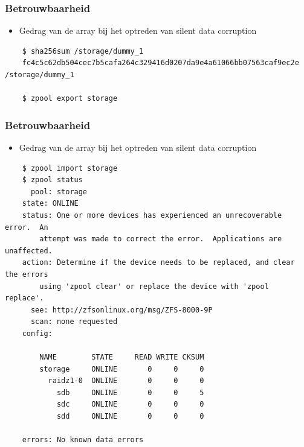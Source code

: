 \documentclass{beamer}
\begin{document}
\begin{frame}[fragile]
  \frametitle{Betrouwbaarheid}
  \begin{itemize}
    \item Gedrag van de array bij het optreden van silent data corruption
  \end{itemize}
  \begin{verbatim}
    $ sha256sum /storage/dummy_1 
    fc4c5c62db504cec7b5cafa264c329416d0207da9e4a61066bb07563caf9ec2e  /storage/dummy_1
    
    $ zpool export storage

  \end{verbatim}
\end{frame}

\begin{frame}[fragile]
  \frametitle{Betrouwbaarheid}
  \begin{itemize}
    \item Gedrag van de array bij het optreden van silent data corruption
  \end{itemize}
  \begin{verbatim}
    $ zpool import storage
    $ zpool status
      pool: storage
    state: ONLINE
    status: One or more devices has experienced an unrecoverable error.  An
	    attempt was made to correct the error.  Applications are unaffected.
    action: Determine if the device needs to be replaced, and clear the errors
	    using 'zpool clear' or replace the device with 'zpool replace'.
      see: http://zfsonlinux.org/msg/ZFS-8000-9P
      scan: none requested
    config:

	    NAME        STATE     READ WRITE CKSUM
	    storage     ONLINE       0     0     0
	      raidz1-0  ONLINE       0     0     0
	        sdb     ONLINE       0     0     5
	        sdc     ONLINE       0     0     0
	        sdd     ONLINE       0     0     0

    errors: No known data errors
  \end{verbatim}
\end{frame}
\end{document}
